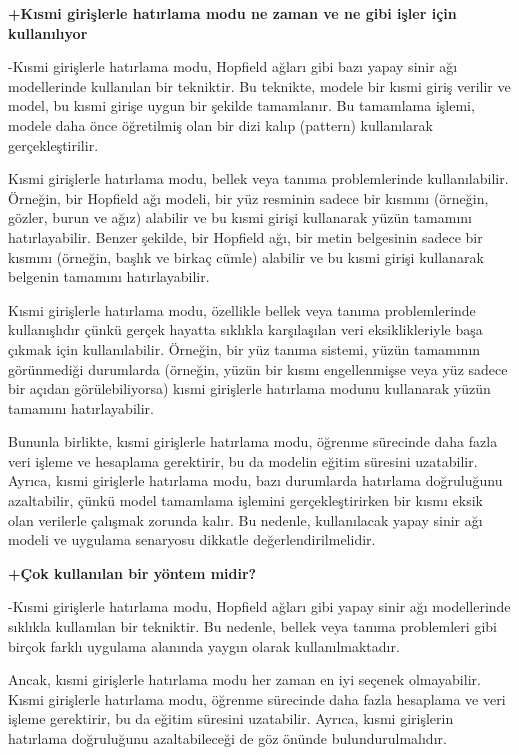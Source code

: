 \documentclass[11pt]{article}
\begin{document}
\textbf{+Kısmi girişlerle hatırlama modu ne zaman ve ne gibi işler için kullanılıyor}

-Kısmi girişlerle hatırlama modu, Hopfield ağları gibi bazı yapay sinir ağı modellerinde kullanılan bir tekniktir. Bu teknikte, modele bir kısmi giriş verilir ve model, bu kısmi girişe uygun bir şekilde tamamlanır. Bu tamamlama işlemi, modele daha önce öğretilmiş olan bir dizi kalıp (pattern) kullanılarak gerçekleştirilir.

Kısmi girişlerle hatırlama modu, bellek veya tanıma problemlerinde kullanılabilir. Örneğin, bir Hopfield ağı modeli, bir yüz resminin sadece bir kısmını (örneğin, gözler, burun ve ağız) alabilir ve bu kısmi girişi kullanarak yüzün tamamını hatırlayabilir. Benzer şekilde, bir Hopfield ağı, bir metin belgesinin sadece bir kısmını (örneğin, başlık ve birkaç cümle) alabilir ve bu kısmi girişi kullanarak belgenin tamamını hatırlayabilir.

Kısmi girişlerle hatırlama modu, özellikle bellek veya tanıma problemlerinde kullanışlıdır çünkü gerçek hayatta sıklıkla karşılaşılan veri eksiklikleriyle başa çıkmak için kullanılabilir. Örneğin, bir yüz tanıma sistemi, yüzün tamamının görünmediği durumlarda (örneğin, yüzün bir kısmı engellenmişse veya yüz sadece bir açıdan görülebiliyorsa) kısmi girişlerle hatırlama modunu kullanarak yüzün tamamını hatırlayabilir.

Bununla birlikte, kısmi girişlerle hatırlama modu, öğrenme sürecinde daha fazla veri işleme ve hesaplama gerektirir, bu da modelin eğitim süresini uzatabilir. Ayrıca, kısmi girişlerle hatırlama modu, bazı durumlarda hatırlama doğruluğunu azaltabilir, çünkü model tamamlama işlemini gerçekleştirirken bir kısmı eksik olan verilerle çalışmak zorunda kalır. Bu nedenle, kullanılacak yapay sinir ağı modeli ve uygulama senaryosu dikkatle değerlendirilmelidir.

\textbf{+Çok kullanılan bir yöntem midir?}

-Kısmi girişlerle hatırlama modu, Hopfield ağları gibi yapay sinir ağı modellerinde sıklıkla kullanılan bir tekniktir. Bu nedenle, bellek veya tanıma problemleri gibi birçok farklı uygulama alanında yaygın olarak kullanılmaktadır.

Ancak, kısmi girişlerle hatırlama modu her zaman en iyi seçenek olmayabilir. Kısmi girişlerle hatırlama modu, öğrenme sürecinde daha fazla hesaplama ve veri işleme gerektirir, bu da eğitim süresini uzatabilir. Ayrıca, kısmi girişlerin hatırlama doğruluğunu azaltabileceği de göz önünde bulundurulmalıdır.
\end{document}
